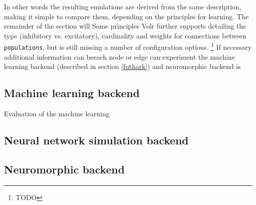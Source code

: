 In other words the resulting emulations are derived from the same description, making it simple to compare them, depending on the principles for learning.
The remainder of the section will
Some principles
Volr further supports detailing the type (inhibitory vs. excitatory), cardinality and weights for connections between \texttt{populations}, but is still missing a number of configuration options.
\footnote{TODO}
If necessary additional information can beeach node or edge can
 experiment the machine learning backend (described in section \ref{futhark}) and neuromorphic backend is

\subsection{Machine learning backend} \label{sec:futhark}
Evaluation of the machine learning

\subsection{Neural network simulation backend}

\subsection{Neuromorphic backend} \label{sec:neuromorphic}
